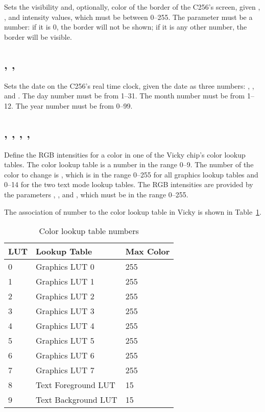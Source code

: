 \documentclass{report}
\begin{document}
    Sets the visibility and, optionally, color of the border of the C256's screen, given
    , , and  intensity values, which must be
    between 0--255.
    The parameter  must be a number: if it is 0, the border
    will not be shown; if it is any other number, the border will be visible.

    \subsection*{ , , }

    Sets the date on the C256's real time clock, given the date as three numbers:
    , , and .
    The day number must be from 1--31.
    The month number must be from 1--12.
    The year number must be from 0--99.

    \subsection*{ , , , , }

    Define the RGB intensities for a color in one of the Vicky chip's color lookup tables.
    The color lookup table is a number  in the range 0--9.
    The number of the color to change is , which is in the range 0--255 for all graphics lookup tables
    and 0--14 for the two text mode lookup tables.
    The RGB intensities are provided by the parameters , , and , which 
    must be in the range 0--255.

    The association of  number to the color lookup table in Vicky
    is shown in Table~\ref{luts}.

    \begin{table}
        \begin{tabular}{|l|l|l|} \hline
            LUT & Lookup Table & Max Color \\ \hline\hline
            0 & Graphics LUT 0 & 255 \\ \hline
            1 & Graphics LUT 1 & 255 \\ \hline
            2 & Graphics LUT 2 & 255 \\ \hline
            3 & Graphics LUT 3 & 255 \\ \hline
            4 & Graphics LUT 4 & 255 \\ \hline
            5 & Graphics LUT 5 & 255 \\ \hline
            6 & Graphics LUT 6 & 255 \\ \hline
            7 & Graphics LUT 7 & 255 \\ \hline
            8 & Text Foreground LUT & 15 \\ \hline
            9 & Text Background LUT & 15 \\ \hline
        \end{tabular}
        \caption{Color lookup table numbers}
        \label{luts}
    \end{table}
\end{document}
